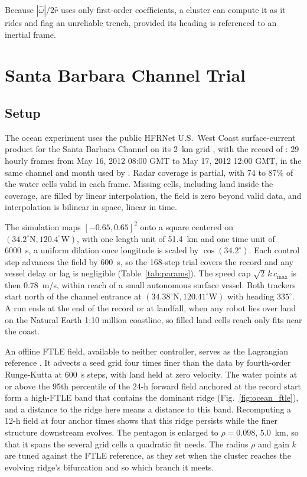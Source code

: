 \documentclass[lettersize,journal]{IEEEtran}
\begin{document}
Because $|\hat{\omega}|/2\hat{r}$ uses only first-order coefficients, a
cluster can compute it as it rides and flag an unreliable trench, provided
its heading is referenced to an inertial frame.

\section{Santa Barbara Channel Trial}
\label{sec:ocean}

\subsection{Setup}
\label{sec:ocean_sim}

The ocean experiment uses the public HFRNet U.S.~West Coast surface-current
product for the Santa Barbara Channel on its 2~km grid \cite{35,36}, with
the record of \cite{26}: 29 hourly frames from May 16, 2012 08:00 GMT to
May 17, 2012 12:00 GMT, in the same channel and month used by \cite{29}.
Radar coverage is partial, with 74 to 87\% of the water cells valid in
each frame. Missing cells, including land inside the coverage, are filled
by linear interpolation, the field is zero beyond valid data, and
interpolation is bilinear in space, linear in time.

The simulation maps $[-0.65, 0.65]^2$ onto a square centered on
$(34.2^{\circ}\mathrm{N}, 120.4^{\circ}\mathrm{W})$, with one length unit
of 51.4~km and one time unit of 6000~s, a uniform dilation once longitude
is scaled by $\cos(34.2^{\circ})$. Each control step advances
the field by 600~s, so the 168-step trial covers the record and any vessel
delay or lag is negligible (Table~\ref{tab:params}). The speed cap
$\sqrt{2}\,k\,c_{\max}$ is then 0.78~m/s, within reach of a small
autonomous surface vessel. Both trackers start north of the channel
entrance at $(34.38^{\circ}\mathrm{N}, 120.41^{\circ}\mathrm{W})$ with
heading $335^\circ$. A run ends at the end of the record or at landfall,
when any robot lies over land on the Natural Earth 1:10 million coastline,
so filled land cells reach only fits near the coast.

An offline FTLE field, available to neither controller, serves as the
Lagrangian reference \cite{14}. It advects a seed grid four times finer
than the data by fourth-order Runge-Kutta at 600~s steps, with land held
at zero velocity. The water points at or above the 95th percentile of the
24-h forward field anchored at the record start form a high-FTLE band that
contains the dominant ridge (Fig.~\ref{fig:ocean_ftle}), and a distance to
the ridge here means a distance to this band. Recomputing a 12-h field at
four anchor times shows that this ridge persists while the finer structure
downstream evolves. The pentagon is enlarged to $\rho = 0.098$, 5.0~km,
so that it spans the several grid cells a quadratic fit needs. The radius $\rho$ and gain $k$ are tuned
against the FTLE reference, as they set when the cluster reaches the
evolving ridge's bifurcation and so which branch it meets.
\end{document}
